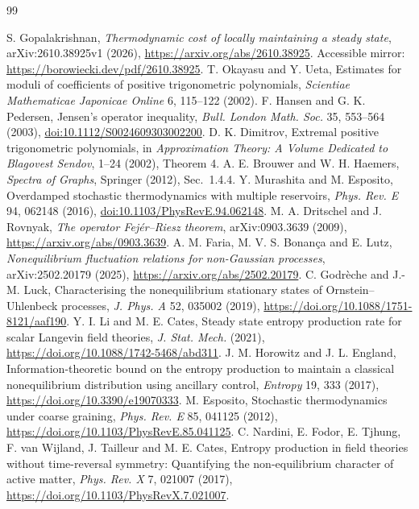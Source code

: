 \documentclass[11pt]{article}
\begin{document}
\begin{thebibliography}{99}
\raggedright
{} S. Gopalakrishnan, \emph{Thermodynamic cost of locally maintaining a steady state}, arXiv:2610.38925v1 (2026), \url{https://arxiv.org/abs/2610.38925}. Accessible mirror: \url{https://borowiecki.dev/pdf/2610.38925}.
 T. Okayasu and Y. Ueta, Estimates for moduli of coefficients of positive trigonometric polynomials, \emph{Scientiae Mathematicae Japonicae Online} 6, 115--122 (2002).
 F. Hansen and G. K. Pedersen, Jensen's operator inequality, \emph{Bull. London Math. Soc.} 35, 553--564 (2003), \href{https://doi.org/10.1112/S0024609303002200}{doi:10.1112/S0024609303002200}.
 D. K. Dimitrov, Extremal positive trigonometric polynomials, in \emph{Approximation Theory: A Volume Dedicated to Blagovest Sendov}, 1--24 (2002), Theorem 4.
 A. E. Brouwer and W. H. Haemers, \emph{Spectra of Graphs}, Springer (2012), Sec.~1.4.4.
 Y. Murashita and M. Esposito, Overdamped stochastic thermodynamics with multiple reservoirs, \emph{Phys. Rev. E} 94, 062148 (2016), \href{https://doi.org/10.1103/PhysRevE.94.062148}{doi:10.1103/PhysRevE.94.062148}.
 M. A. Dritschel and J. Rovnyak, \emph{The operator Fej\'er--Riesz theorem}, arXiv:0903.3639 (2009), \url{https://arxiv.org/abs/0903.3639}.
 A. M. Faria, M. V. S. Bonan\c{c}a and E. Lutz, \emph{Nonequilibrium fluctuation relations for non-Gaussian processes}, arXiv:2502.20179 (2025), \url{https://arxiv.org/abs/2502.20179}.
 C. Godr\`eche and J.-M. Luck, Characterising the nonequilibrium stationary states of Ornstein--Uhlenbeck processes, \emph{J. Phys. A} 52, 035002 (2019), \url{https://doi.org/10.1088/1751-8121/aaf190}.
 Y. I. Li and M. E. Cates, Steady state entropy production rate for scalar Langevin field theories, \emph{J. Stat. Mech.} (2021), \url{https://doi.org/10.1088/1742-5468/abd311}.
 J. M. Horowitz and J. L. England, Information-theoretic bound on the entropy production to maintain a classical nonequilibrium distribution using ancillary control, \emph{Entropy} 19, 333 (2017), \url{https://doi.org/10.3390/e19070333}.
 M. Esposito, Stochastic thermodynamics under coarse graining, \emph{Phys. Rev. E} 85, 041125 (2012), \url{https://doi.org/10.1103/PhysRevE.85.041125}.
 C. Nardini, E. Fodor, E. Tjhung, F. van Wijland, J. Tailleur and M. E. Cates, Entropy production in field theories without time-reversal symmetry: Quantifying the non-equilibrium character of active matter, \emph{Phys. Rev. X} 7, 021007 (2017), \url{https://doi.org/10.1103/PhysRevX.7.021007}.

\end{thebibliography}
\end{document}
